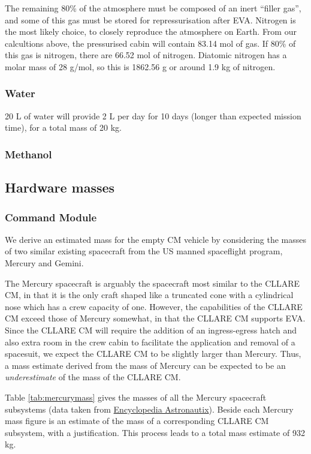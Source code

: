 \documentclass{report}
\begin{document}
The remaining 80\% of the atmosphere must be composed of an inert ``filler gas'', and some of this gas must be stored for repressurisation after EVA.  Nitrogen is the most likely choice, to closely reproduce the atmosphere on Earth.  From our calcultions above, the pressurised cabin will contain 83.14 mol of gas.  If 80\% of this gas is nitrogen, there are 66.52 mol of nitrogen.  Diatomic nitrogen has a molar mass of 28 g/mol, so this is 1862.56 g or around 1.9 kg of nitrogen.

\subsubsection{Water}

20 L of water will provide 2 L per day for 10 days (longer than expected mission time), for a total mass of 20 kg.

\subsubsection{Methanol}

\subsection{Hardware masses}

\subsubsection{Command Module}

We derive an estimated mass for the empty CM vehicle by considering the masses of two similar existing spacecraft from the US manned spaceflight program, Mercury and Gemini.

The Mercury spacecraft is arguably the spacecraft most similar to the CLLARE CM, in that it is the only craft shaped like a truncated cone with a cylindrical nose which has a crew capacity of one.  However, the capabilities of the CLLARE CM exceed those of Mercury somewhat, in that the CLLARE CM supports EVA.  Since the CLLARE CM will require the addition of an ingress-egress hatch and also extra room in the crew cabin to facilitate the application and removal of a spacesuit, we expect the CLLARE CM to be slightly larger than Mercury.  Thus, a mass estimate derived from the mass of Mercury can be expected to be an \emph{underestimate} of the mass of the CLLARE CM.

Table \ref{tab:mercurymass} gives the masses of all the Mercury spacecraft subsystems (data taken from \href{http://www.astronautix.com/craft/mercury.htm}{Encyclopedia Astronautix}).  Beside each Mercury mass figure is an estimate of the mass of a corresponding CLLARE CM subsystem, with a justification.  This process leads to a total mass estimate of 932 kg.
 
\end{document}
